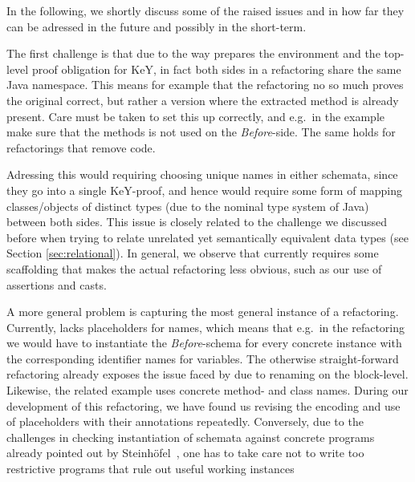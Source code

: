 In the following, we shortly discuss some of the raised issues and in how far they can be adressed in the future and possibly in the short-term.

The first challenge is that due to the way \Refinity{} prepares the environment and the top-level proof obligation for KeY,
in fact both sides in a refactoring share the same Java namespace.
This means for example that the  refactoring no so much proves the original correct, but rather a version where the extracted method is already present.
Care must be taken to set this up correctly, and e.g.\ in the  example make sure that the methods is not used on the \textit{Before}-side.
The same holds for refactorings that remove code.

Adressing this would requiring choosing unique names in either schemata, since they go into a single KeY-proof, and hence would require some form of mapping classes/objects of distinct types (due to the nominal type system of Java) between both sides.
This issue is closely related to the challenge we discussed before when trying to relate unrelated yet semantically equivalent data types (see Section \ref{sec:relational}).
In general, we observe that currently \Refinity{} requires some scaffolding that makes the actual refactoring less obvious,
such as our use of assertions and casts.

A more general problem is capturing the most general instance of a refactoring.
Currently, \Refinity{} lacks placeholders for names, which means that e.g.\ in the  refactoring we would have to instantiate the \textit{Before}-schema for every concrete instance with the corresponding identifier names for variables.
The otherwise straight-forward refactoring  already exposes the issue faced by \Refinity{} due to renaming on the block-level.
Likewise, the related  example uses concrete method- and class names.
During our development of this refactoring, we have found us revising the encoding and use of placeholders with their annotations repeatedly.
Conversely, due to the challenges in checking instantiation of schemata against concrete programs already pointed out by Steinhöfel~\cite[119,137]{steinhoefel-20},
one has to take care not to write too restrictive programs that rule out useful working instances

